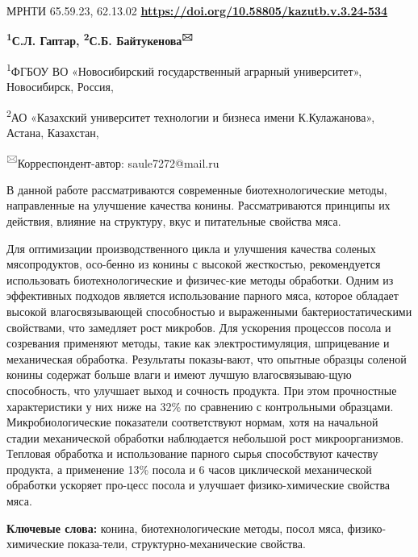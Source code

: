 \newpage
МРНТИ 65.59.23, 62.13.02
\hfill {\bfseries \href{https://doi.org/10.58805/kazutb.v.3.24-534}{https://doi.org/10.58805/kazutb.v.3.24-534}}

\begin{center}

{\bfseries \textsuperscript{1}С.Л. Гаптар, \textsuperscript{2}С.Б.
Байтукенова\textsuperscript{🖂}}

\textsuperscript{1}ФГБОУ ВО «Новосибирский государственный аграрный
университет», Новосибирск, Россия,

\textsuperscript{2}АО «Казахский университет технологии и бизнеса имени
К.Кулажанова», Астана, Казахстан,
\end{center}

{\textsuperscript{🖂}}Корреспондент-автор: saule7272@mail.ru\vspace{0.5cm}

В данной работе рассматриваются современные биотехнологические методы,
направленные на улучшение качества конины. Рассматриваются принципы их
действия, влияние на структуру, вкус и питательные свойства мяса.

Для оптимизации производственного цикла и улучшения качества соленых
мясопродуктов, осо-бенно из конины с высокой жесткостью, рекомендуется
использовать биотехнологические и физичес-кие методы обработки. Одним из
эффективных подходов является использование парного мяса, которое
обладает высокой влагосвязывающей способностью и выраженными
бактериостатическими свойствами, что замедляет рост микробов. Для
ускорения процессов посола и созревания применяют методы, такие как
электростимуляция, шприцевание и механическая обработка. Результаты
показы-вают, что опытные образцы соленой конины содержат больше влаги и
имеют лучшую влагосвязываю-щую способность, что улучшает выход и сочность
продукта. При этом прочностные характеристики у них ниже на 32\% по
сравнению с контрольными образцами. Микробиологические показатели
соответствуют нормам, хотя на начальной стадии механической обработки
наблюдается небольшой рост микроорганизмов. Тепловая обработка и
использование парного сырья способствуют качеству продукта, а применение
13\% посола и 6 часов циклической механической обработки ускоряет
про-цесс посола и улучшает физико-химические свойства мяса.

{\bfseries Ключевые слова:} конина, биотехнологические методы, посол мяса,
физико-химические показа-тели, структурно-механические свойства.


